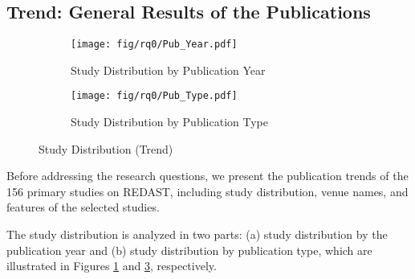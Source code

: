 \subsection{Trend: General Results of the Publications}
\label{sec:Trend}
\begin{figure}
\centering
\begin{subfigure}{.5\textwidth}
  \centering
  \texttt{[image: fig/rq0/Pub\_Year.pdf]}
  \caption{Study Distribution by Publication Year}
  \label{fig:year}
\end{subfigure}%
\begin{subfigure}{.5\textwidth}
  \centering
  \texttt{[image: fig/rq0/Pub\_Type.pdf]}
  \caption{Study Distribution by Publication Type}
  \label{fig:dis_type}
\end{subfigure}
\caption{Study Distribution (Trend)}
\end{figure}

Before addressing the research questions, we present the publication trends of the 156 primary studies on REDAST, including study distribution, venue names, and features of the selected studies.

The study distribution is analyzed in two parts: (a) study distribution by the publication year and (b) study distribution by publication type, which are illustrated in Figures \ref{fig:year} and \ref{fig:dis_type}, respectively.

